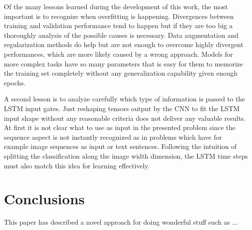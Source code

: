Of the many lessons learned during the development of this work, the most important is to recognize when overfitting is happening. Divergences between training and validation performance tend to happen but if they are too big a thoroughly analysis of the possible causes is necessary. Data augmentation and regularization methods do help but are not enough to overcome highly divergent performances, which are more likely caused by a wrong approach. Models for more complex tasks have so many parameters that is easy for them to memorize the training set completely without any generalization capability given enough epochs. 

A second lesson is to analyze carefully which type of information is passed to the LSTM input gates. Just reshaping tensors output by the CNN to fit the LSTM input shape without any reasonable criteria does not deliver any valuable results. At first it is not clear what to use as input in the presented problem since the sequence aspect is not instantly recognized as in problems which have for example image sequences as input or text sentences. Following the intuition of splitting the classification along the image width dimension, the LSTM time steps must also match this idea for learning effectively. 

\section{Conclusions}

This paper has described a novel approach for doing wonderful stuff such as ...